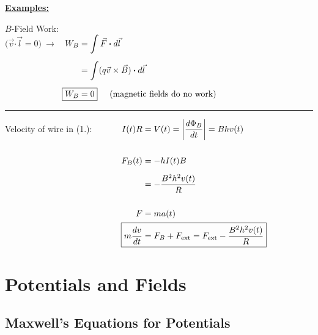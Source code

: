 \documentclass[12pt]{article}
\newcommand*{\dotP}{\boldsymbol \cdot}		%
\begin{document}
\vspace{15pt}\noindent 
\textbf{\underline{Examples:}}\\[15pt]
\noindent
\begin{minipage}[t]{.46\textwidth}
		\(B\)-Field Work:\\[5pt]
		\( \big( \vec{v} \dotP \vec{l} = 0 \big) \ \rightarrow \ \) 
		\( \begin{aligned}[t]
			W_B &= \int \vec{F} \dotP d\vec{l} \\[5pt]
			&= \int ( q \vec{v} \times \vec{B} ) \dotP d\vec{l} \\[5pt]
			\Aboxed{ W_B &= 0 } \hspace{.5cm} \text{(magnetic fields do no work)}
		\end{aligned} \)	
	\end{minipage}
	\rule[-165pt]{.5pt}{185pt}
	\hspace{20pt}
	\begin{minipage}[t]{.49\textwidth}
		Velocity of wire in (1.): \ \ \ \ \ \
		\( \begin{aligned}[t]
			I(t) R &= V(t) = \left| \frac{d \Phi_B}{dt} \right| = B h v(t) \\[15pt]
			F_B(t) &= - h I(t) B \\[5pt]
			&= - \frac{B^2 h^2 v(t)}{R} \\[15pt]
			F &= m a(t) \\
			\Aboxed{ m \frac{dv}{dt} &= F_B + F_\text{ext} = F_\text{ext} - \frac{B^2 h^2 v(t)}{R} }
		\end{aligned} \)
\end{minipage}

\newpage
\section{Potentials and Fields}
\subsection{Maxwell's Equations for Potentials}
\end{document}
